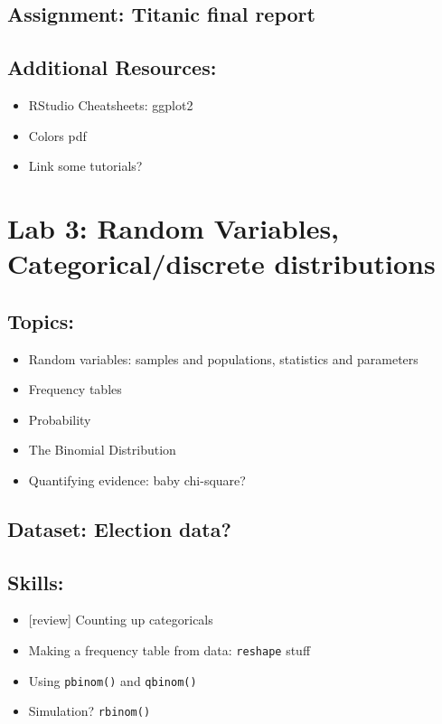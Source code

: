\documentclass[]{article}
\providecommand{\tightlist}{%
  \setlength{\itemsep}{0pt}\setlength{\parskip}{0pt}}
\begin{document}
\subsection{Assignment: Titanic final
report}\label{assignment-titanic-final-report}

\subsection{Additional Resources:}\label{additional-resources-1}

\begin{itemize}
\tightlist
\item
  RStudio Cheatsheets: ggplot2
\item
  Colors pdf
\item
  Link some tutorials?
\end{itemize}

\section{Lab 3: Random Variables, Categorical/discrete
distributions}\label{lab-3-random-variables-categoricaldiscrete-distributions}

\subsection{Topics:}\label{topics-2}

\begin{itemize}
\tightlist
\item
  Random variables: samples and populations, statistics and parameters
\item
  Frequency tables
\item
  Probability
\item
  The Binomial Distribution
\item
  Quantifying evidence: baby chi-square?
\end{itemize}

\subsection{Dataset: Election data?}\label{dataset-election-data}

\subsection{Skills:}\label{skills}

\begin{itemize}
\tightlist
\item
  {[}review{]} Counting up categoricals
\item
  Making a frequency table from data: \texttt{reshape} stuff
\item
  Using \texttt{pbinom()} and \texttt{qbinom()}
\item
  Simulation? \texttt{rbinom()}
\end{itemize}
\end{document}

